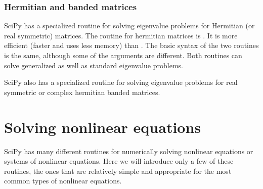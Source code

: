 \documentclass[letterpaper,10pt,english]{sphinxmanual}
\begin{document}
\ignorespaces 

\subsubsection{Hermitian and banded matrices}
\label{\detokenize{chap9/chap9_scipy:hermitian-and-banded-matrices}}\label{\detokenize{chap9/chap9_scipy:index-10}}
\sphinxAtStartPar
SciPy has a specialized routine for solving eigenvalue problems for Hermitian (or real symmetric) matrices.  The routine for hermitian matrices is .  It is more efficient (faster and uses less memory) than .  The basic syntax of the two routines is the same, although some of the  arguments are different.  Both routines can solve generalized as well as standard eigenvalue problems.

\sphinxAtStartPar
SciPy also has a specialized routine  for solving eigenvalue problems for real symmetric or complex hermitian banded matrices.

\ignorespaces 

\section{Solving non\sphinxhyphen{}linear equations}
\label{\detokenize{chap9/chap9_scipy:solving-non-linear-equations}}\label{\detokenize{chap9/chap9_scipy:sec-findingroots}}\label{\detokenize{chap9/chap9_scipy:index-11}}
\sphinxAtStartPar
SciPy has many different routines for numerically solving non\sphinxhyphen{}linear equations or systems of non\sphinxhyphen{}linear equations.  Here we will introduce only a few of these routines, the ones that are relatively simple and appropriate for the most common types of nonlinear equations.
\end{document}
